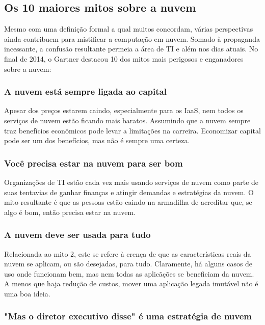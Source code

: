 \subsection{Os 10 maiores mitos sobre a nuvem}

Mesmo com uma definição formal a qual muitos concordam, várias perspectivas ainda
contribuem para mistificar a computação em nuvem. Somado à propaganda incessante,
a confusão resultante permeia a área de TI e além nos dias atuais. No final de 2014,
o Gartner destacou 10 dos mitos mais perigosos e enganadores sobre a nuvem:

    \subsubsection{A nuvem está sempre ligada ao capital}

    Apesar dos preços estarem caindo, especialmente para os IaaS, nem todos os
    serviços de nuvem estão ficando mais baratos. Assumindo que a nuvem sempre traz
    benefícios econômicos pode levar a limitações na carreira. Economizar capital
    pode ser um dos benefícios, mas não é sempre uma certeza.

    \subsubsection{Você precisa estar na nuvem para ser bom}

    Organizações de TI estão cada vez mais usando serviços de nuvem como parte de
    suas tentavias de ganhar finanças e atingir demandas e estratégias da nuvem. O
    mito resultante é que as pessoas estão caindo na armadilha de acreditar que, se
    algo é bom, então precisa estar na nuvem.

    \subsubsection{A nuvem deve ser usada para tudo}

    Relacionada ao mito 2, este se refere à crença de que as características reais da
    nuvem se aplicam, ou são desejadas, para tudo. Claramente, há alguns casos de uso
    onde funcionam bem, mas nem todas as aplicãções se beneficiam da nuvem. A menos
    que haja redução de custos, mover uma aplicação legada imutável não é uma boa
    ideia.

    \subsubsection{"Mas o diretor executivo disse" é uma estratégia de nuvem}

